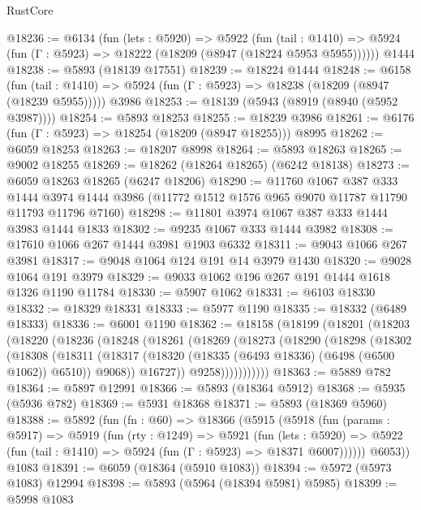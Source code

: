 \begin{lexlean}{RustCore}
\begin{coremodule}
@18236 := @6134
    (fun (lets : @5920) =>
    @5922
      (fun (tail : @1410) =>
      @5924 (fun (Γ : @5923) => @18222 (@18209 (@8947 (@18224 @5953 @5955))))))
    @1444
@18238 := @5893 (@18139 @17551)
@18239 := @18224 @1444
@18248 := @6158
    (fun (tail : @1410) => @5924 (fun (Γ : @5923) => @18238 (@18209 (@8947 (@18239 @5955)))))
    @3986
@18253 := @18139 (@5943 (@8919 (@8940 (@5952 @3987))))
@18254 := @5893 @18253
@18255 := @18239 @3986
@18261 := @6176 (fun (Γ : @5923) => @18254 (@18209 (@8947 @18255))) @8995
@18262 := @6059 @18253
@18263 := @18207 @8998
@18264 := @5893 @18263
@18265 := @9002 @18255
@18269 := @18262 (@18264 @18265) (@6242 @18138)
@18273 := @6059 @18263 @18265 (@6247 @18206)
@18290 := @11760
    @1067
    @387
    @333
    @1444
    @3974
    @1444
    @3986
    (@11772 @1512 @1576 @965 @9070 @11787 @11790 @11793 @11796 @7160)
@18298 := @11801 @3974 @1067 @387 @333 @1444 @3983 @1444 @1833
@18302 := @9235 @1067 @333 @1444 @3982
@18308 := @17610 @1066 @267 @1444 @3981 @1903 @6332
@18311 := @9043 @1066 @267 @3981
@18317 := @9048 @1064 @124 @191 @14 @3979 @1430
@18320 := @9028 @1064 @191 @3979
@18329 := @9033 @1062 @196 @267 @191 @1444 @1618 @1326 @1190 @11784
@18330 := @5907 @1062
@18331 := @6103 @18330
@18332 := @18329 @18331
@18333 := @5977 @1190
@18335 := @18332 (@6489 @18333)
@18336 := @6001 @1190
@18362 := @18158
    (@18199
      (@18201
        (@18203
          (@18220
            (@18236
              (@18248
                (@18261
                  (@18269
                    (@18273
                      (@18290
                        (@18298
                          (@18302
                            (@18308
                              (@18311
                                (@18317
                                  (@18320 (@18335 (@6493 @18336) (@6498 (@6500 @1062)) @6510))
                                  @9068))
                              @16727))
                          @9258)))))))))))
@18363 := @5889 @782
@18364 := @5897 @12991
@18366 := @5893 (@18364 @5912)
@18368 := @5935 (@5936 @782)
@18369 := @5931 @18368
@18371 := @5893 (@18369 @5960)
@18388 := @5892
    (fun (fn : @60) =>
    @18366
      (@5915
        (@5918
          (fun (params : @5917) =>
          @5919
            (fun (rty : @1249) =>
            @5921
              (fun (lets : @5920) =>
              @5922 (fun (tail : @1410) => @5924 (fun (Γ : @5923) => @18371 @6007))))))
        @6053))
    @1083
@18391 := @6059 (@18364 (@5910 @1083))
@18394 := @5972 (@5973 @1083) @12994
@18398 := @5893 (@5964 (@18394 @5981) @5985)
@18399 := @5998 @1083

\end{coremodule}
\end{lexlean}
